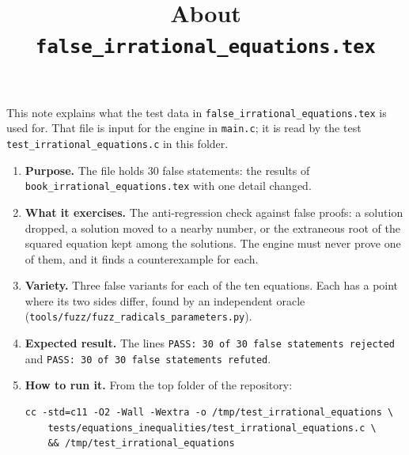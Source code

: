 \documentclass[11pt,a4paper]{article}
\title{About \texttt{false\_irrational\_equations.tex}}
\author{}
\date{}
\begin{document}
\maketitle
This note explains what the test data in \texttt{false\_irrational\_equations.tex} is used for. That file is input for the engine in \texttt{main.c}; it is read by the test \texttt{test\_irrational\_equations.c} in this folder.

\begin{enumerate}
\item \textbf{Purpose.} The file holds 30 false statements: the results of \texttt{book\_irrational\_equations.tex} with one detail changed.

\item \textbf{What it exercises.} The anti-regression check against false proofs: a solution dropped, a solution moved to a nearby number, or the extraneous root of the squared equation kept among the solutions. The engine must never prove one of them, and it finds a counterexample for each.

\item \textbf{Variety.} Three false variants for each of the ten equations. Each has a point where its two sides differ, found by an independent oracle (\texttt{tools/fuzz/fuzz\_radicals\_parameters.py}).

\item \textbf{Expected result.} The lines \texttt{PASS: 30 of 30 false statements rejected} and \texttt{PASS: 30 of 30 false statements refuted}.

\item \textbf{How to run it.} From the top folder of the repository:
\begin{verbatim}
cc -std=c11 -O2 -Wall -Wextra -o /tmp/test_irrational_equations \
    tests/equations_inequalities/test_irrational_equations.c \
    && /tmp/test_irrational_equations
\end{verbatim}
\end{enumerate}
\end{document}
